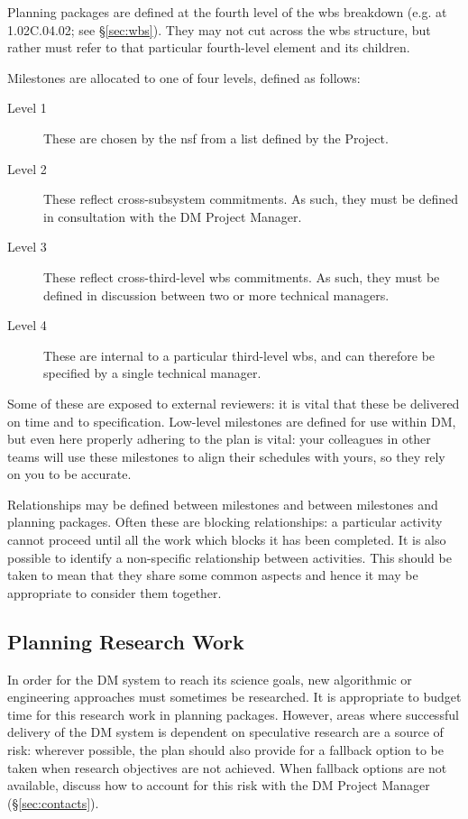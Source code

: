 Planning packages are defined at the fourth level of the \gls{wbs} breakdown (e.g. at 1.02C.04.02; see \S\ref{sec:wbs}).
They may not cut across the \gls{wbs} structure, but rather must refer to that particular fourth-level \gls{element} and its children.

Milestones are allocated to one of four levels, defined as follows:

\begin{description}
\item[Level 1]
These are chosen by the \gls{nsf} from a list defined by the Project.
\item[Level 2]
These reflect cross-subsystem commitments. As such, they must be defined
in consultation with the DM Project Manager.
\item[Level 3]
These reflect cross-third-level \gls{wbs} commitments. As such, they must be
defined in discussion between two or more technical managers.
\item[Level 4]
These are internal to a particular third-level \gls{wbs}, and can therefore be
specified by a single technical manager.
\end{description}

Some of these are exposed to external reviewers: it is vital that these
be delivered on time and to specification. Low-level milestones are
defined for use within DM, but even here properly adhering to the plan
is vital: your colleagues in other teams will use these milestones to
align their schedules with yours, so they rely on you to be accurate.

Relationships may be defined between milestones and between milestones and planning packages.
Often these are blocking relationships: a particular activity cannot proceed until all the work which blocks it has been completed.
It is also possible to identify a non-specific relationship between activities.
This should be taken to mean that they share some common aspects and hence it may be appropriate to consider them together.

\subsection{Planning Research Work}
\label{sec:long-term-research}

In order for the DM system to reach its science goals, new algorithmic or engineering approaches must sometimes be researched.
It is appropriate to budget time for this research work in planning packages.
However, areas where successful delivery of the DM system is dependent on speculative research are a source of \gls{risk}: wherever possible, the plan should also provide for a fallback option to be taken when research objectives are not achieved.
When fallback options are not available, discuss how to account for this \gls{risk} with the DM Project Manager (\S\ref{sec:contacts}).

